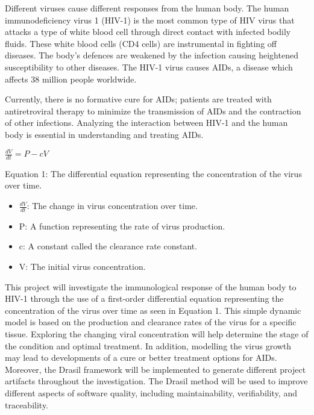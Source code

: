 \documentclass{article}
\begin{document}
Different viruses cause different responses from the human body. The human 
immunodeficiency virus 1 (HIV-1) is the most common type of HIV virus that 
attacks a type of white blood cell through direct contact with infected bodily 
fluids. These white blood cells (CD4 cells) are instrumental in fighting off 
diseases. The body’s defences are weakened by the infection causing heightened 
susceptibility to other diseases. The HIV-1 virus causes AIDs, a disease which 
affects 38 million people worldwide. 

Currently, there is no formative cure for AIDs; patients are treated with 
antiretroviral therapy to minimize the transmission of AIDs and the contraction 
of other infections. Analyzing the interaction between HIV-1 and the human body 
is essential in understanding and treating AIDs. 

\begin{center}
$\frac{dV}{dt}= P - cV$

Equation 1: The differential equation representing the concentration of the 
virus over time. 
\end{center}

\begin{itemize}
	\item $\frac{dV}{dt}$: The change in virus concentration over time. 
	\item P: A function representing the rate of virus production. 
	\item c: A constant called the clearance rate constant.
	\item V: The initial virus concentration.
\end{itemize}

This project will investigate the immunological response of the human body to 
HIV-1 through the use of a first-order differential equation representing the 
concentration of the virus over time as seen in Equation  1. This simple dynamic 
model is based on the production and clearance rates of the virus for a specific 
tissue.  Exploring the changing viral concentration will help determine the 
stage of the condition and optimal treatment. In addition, modelling the virus 
growth may lead to developments of a cure or better treatment options for AIDs. 
Moreover, the Drasil framework will be implemented to generate different project 
artifacts throughout the investigation. The Drasil method will be used to 
improve different aspects of software quality, including maintainability, 
verifiability, and traceability.
\end{document}
